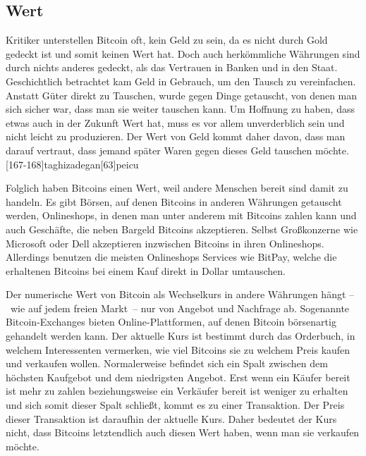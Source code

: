 \subsection{Wert}

Kritiker unterstellen Bitcoin oft, kein Geld zu sein, da es nicht durch Gold gedeckt ist und somit keinen Wert hat.
Doch auch herkömmliche Währungen sind durch nichts anderes gedeckt, als das Vertrauen in Banken und in den Staat.
Geschichtlich betrachtet kam Geld in Gebrauch, um den Tausch zu vereinfachen.
Anstatt Güter direkt zu Tauschen, wurde gegen Dinge getauscht, von denen man sich sicher war, dass man sie weiter tauschen kann.
Um Hoffnung zu haben, dass etwas auch in der Zukunft Wert hat, muss es vor allem unverderblich sein und nicht leicht zu produzieren.
Der Wert von Geld kommt daher davon, dass man darauf vertraut, dass jemand später Waren gegen dieses Geld tauschen möchte.
[167-168]{taghizadegan}[63]{peicu}

Folglich haben Bitcoins einen Wert, weil andere Menschen bereit sind damit zu handeln.
Es gibt Börsen, auf denen Bitcoins in anderen Währungen getauscht werden, Onlineshops, in denen man unter anderem mit Bitcoins zahlen kann und auch Geschäfte, die neben Bargeld Bitcoins akzeptieren.
Selbst Großkonzerne wie Microsoft oder Dell akzeptieren inzwischen Bitcoins in ihren Onlineshops.
Allerdings benutzen die meisten Onlineshops Services wie BitPay, welche die erhaltenen Bitcoins bei einem Kauf direkt in Dollar umtauschen.

Der numerische Wert von Bitcoin als Wechselkurs in andere Währungen hängt --~wie auf jedem freien Markt~-- nur von Angebot und Nachfrage ab.
Sogenannte Bitcoin-Exchanges bieten Online-Plattformen, auf denen Bitcoin börsenartig gehandelt werden kann.
Der aktuelle Kurs ist bestimmt durch das Orderbuch, in welchem Interessenten vermerken, wie viel Bitcoins sie zu welchem Preis kaufen und verkaufen wollen.
Normalerweise befindet sich ein Spalt zwischen dem höchsten Kaufgebot und dem niedrigsten Angebot.
Erst wenn ein Käufer bereit ist mehr zu zahlen beziehungsweise ein Verkäufer bereit ist weniger zu erhalten und sich somit dieser Spalt schließt, kommt es zu einer Transaktion.
Der Preis dieser Transaktion ist daraufhin der aktuelle Kurs.
Daher bedeutet der Kurs nicht, dass Bitcoins letztendlich auch diesen Wert haben, wenn man sie verkaufen möchte.
